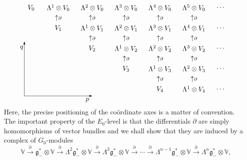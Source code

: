 \begin{equation}\label{E0}\raisebox{-70pt}{\begin{picture}(300,148)(0,10)
\put(0,20){\vector(1,0){100}}
\put(0,20){\vector(0,1){80}}
\put(93,14){\makebox(0,0){$p$}}
\put(-4,91){\makebox(0,0){$q$}}
\put(10,150){\makebox(0,0){$V_0$}}
\put(50,150){\makebox(0,0){$\Lambda^1\otimes V_0$}}
\put(100,150){\makebox(0,0){$\Lambda^2\otimes V_0$}}
\put(150,150){\makebox(0,0){$\Lambda^3\otimes V_0$}}
\put(200,150){\makebox(0,0){$\Lambda^4\otimes V_0$}}
\put(250,150){\makebox(0,0){$\Lambda^5\otimes V_0$}}
\put(290,150){\makebox(0,0){$\cdots$}}
\put(290,120){\makebox(0,0){$\cdots$}}
\put(290,90){\makebox(0,0){$\cdots$}}
\put(290,60){\makebox(0,0){$\cdots$}}
\put(290,30){\makebox(0,0){$\cdots$}}
\put(50,135){\makebox(0,0){$\uparrow\scriptstyle\partial$}}
\put(100,135){\makebox(0,0){$\uparrow\scriptstyle\partial$}}
\put(150,135){\makebox(0,0){$\uparrow\scriptstyle\partial$}}
\put(200,135){\makebox(0,0){$\uparrow\scriptstyle\partial$}}
\put(250,135){\makebox(0,0){$\uparrow\scriptstyle\partial$}}
\put(50,120){\makebox(0,0){$V_1$}}
\put(100,120){\makebox(0,0){$\Lambda^1\otimes V_1$}}
\put(150,120){\makebox(0,0){$\Lambda^2\otimes V_1$}}
\put(200,120){\makebox(0,0){$\Lambda^3\otimes V_1$}}
\put(250,120){\makebox(0,0){$\Lambda^4\otimes V_1$}}
\put(100,105){\makebox(0,0){$\uparrow\scriptstyle\partial$}}
\put(150,105){\makebox(0,0){$\uparrow\scriptstyle\partial$}}
\put(200,105){\makebox(0,0){$\uparrow\scriptstyle\partial$}}
\put(250,105){\makebox(0,0){$\uparrow\scriptstyle\partial$}}
\put(100,90){\makebox(0,0){$V_2$}}
\put(150,90){\makebox(0,0){$\Lambda^1\otimes V_2$}}
\put(200,90){\makebox(0,0){$\Lambda^2\otimes V_2$}}
\put(250,90){\makebox(0,0){$\Lambda^3\otimes V_2$}}
\put(150,75){\makebox(0,0){$\uparrow\scriptstyle\partial$}}
\put(200,75){\makebox(0,0){$\uparrow\scriptstyle\partial$}}
\put(250,75){\makebox(0,0){$\uparrow\scriptstyle\partial$}}
\put(150,60){\makebox(0,0){$V_3$}}
\put(200,60){\makebox(0,0){$\Lambda^1\otimes V_3$}}
\put(250,60){\makebox(0,0){$\Lambda^2\otimes V_3$}}
\put(200,45){\makebox(0,0){$\uparrow\scriptstyle\partial$}}
\put(250,45){\makebox(0,0){$\uparrow\scriptstyle\partial$}}
\put(200,30){\makebox(0,0){$V_4$}}
\put(250,30){\makebox(0,0){$\Lambda^1\otimes V_4$}}
\end{picture}}\end{equation}
Here, the precise positioning of the co\"ordinate axes is a matter of
convention. The important property of the $E_0$-level is that the
dif\/ferentials $\partial$ are simply homomorphisms of vector bundles and we
shall show that they are induced by a complex of $G_0$-modules
\[{\mathbb{V}}\stackrel{\partial}{\longrightarrow}
{\mathfrak{g}}_-^*\otimes{\mathbb{V}}\stackrel{\partial}{\longrightarrow}
\Lambda^2{\mathfrak{g}}_-^*\otimes{\mathbb{V}}
\stackrel{\partial}{\longrightarrow}
\Lambda^3{\mathfrak{g}}_-^*\otimes{\mathbb{V}}
\stackrel{\partial}{\longrightarrow}\cdots\stackrel{\partial}{\longrightarrow}
\Lambda^{n-1}{\mathfrak{g}}_-^*\otimes{\mathbb{V}}
\stackrel{\partial}{\longrightarrow}
\Lambda^n{\mathfrak{g}}_-^*\otimes{\mathbb{V}},\]
\newpage

